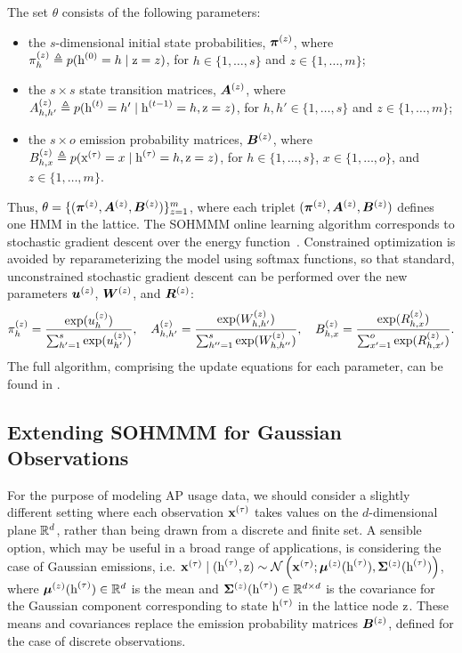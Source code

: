 The set $\theta$ consists of the following parameters:
\begin{itemize}
	\item the $s$-dimensional initial state probabilities, ${\bm{\pi}}^{(z)}$, where ${\pi}_h^{(z)} \triangleq p({\textnormal{h}}^{(0)}=h \mid {\textnormal{z}}=z)$, for $h \in \{1,\dots,s\}$ and $z \in \{1,\dots,m\}$;
	\item the $s \times s$ state transition matrices, ${\bm{A}}^{(z)}$, where ${A}^{(z)}_{h,h'} \triangleq p({\textnormal{h}}^{(t)}=h' \mid {\textnormal{h}}^{(t-1)}=h, {\textnormal{z}}=z)$, for $h,h' \in \{1,\dots,s\}$ and $z \in \{1,\dots,m\}$;
	\item the $s \times o$ emission probability matrices, ${\bm{B}}^{(z)}$, where ${B}^{(z)}_{h,x} \triangleq p({\textnormal{x}}^{(\tau)}=x \mid {\textnormal{h}}^{(\tau)}=h, {\textnormal{z}}=z)$, for $h \in \{1,\dots,s\}$, $x \in \{1,\dots,o\}$, and $z \in \{1,\dots,m\}$.
\end{itemize}
Thus, $\theta = \{({\bm{\pi}}^{(z)}, {\bm{A}}^{(z)}, {\bm{B}}^{(z)})\}_{z=1}^m$, where each triplet $({\bm{\pi}}^{(z)}, {\bm{A}}^{(z)}, {\bm{B}}^{(z)})$ defines one HMM in the lattice. The SOHMMM online learning algorithm corresponds to stochastic gradient descent over the energy function~. Constrained optimization is avoided by reparameterizing the model using softmax functions, so that standard, unconstrained stochastic gradient descent can be performed over the new parameters ${\bm{u}}^{(z)}$, ${\bm{W}}^{(z)}$, and ${\bm{R}}^{(z)}$:
\begin{equation}
{\pi}_h^{(z)} = \frac{\exp({u}_h^{(z)})}{\sum_{h'=1}^{s}\exp({u}_{h'}^{(z)})}, \quad
{A}^{(z)}_{h,h'} = \frac{\exp({W}^{(z)}_{h,h'})}{\sum_{h''=1}^{s} \exp({W}^{(z)}_{h,h''})}, \quad
{B}^{(z)}_{h,x} = \frac{\exp({R}^{(z)}_{h,x})}{\sum_{x'=1}^{o} \exp({R}^{(z)}_{h,x'})}.
\end{equation}
The full algorithm, comprising the update equations for each parameter, can be found in \cite{Ferles2008}.

\subsection{Extending SOHMMM for Gaussian Observations}
\label{sec:sohmmm_gaussian}

For the purpose of modeling AP usage data, we should consider a slightly different setting where each observation ${\mathbf{x}}^{(\tau)}$ takes values on the $d$-dimensional plane ${\mathbb{R}}^d$, rather than being drawn from a discrete and finite set. A sensible option, which may be useful in a broad range of applications, is considering the case of Gaussian emissions, i.e. ${\mathbf{x}}^{(\tau)} \mid ({\textnormal{h}}^{(\tau)}, {\textnormal{z}}) \sim \mathcal{N}\left({\mathbf{x}}^{(\tau)}; {\bm{\mu}}^{(z)}({\textnormal{h}}^{(\tau)}), {\bm{\Sigma}}^{(z)}({\textnormal{h}}^{(\tau)})\right)$, where ${\bm{\mu}}^{(z)}({\textnormal{h}}^{(\tau)}) \in {\mathbb{R}}^d$ is the mean and ${\bm{\Sigma}}^{(z)}({\textnormal{h}}^{(\tau)}) \in {\mathbb{R}}^{d \times d}$ is the covariance for the Gaussian component corresponding to state ${\textnormal{h}}^{(\tau)}$ in the lattice node ${\textnormal{z}}$. These means and covariances replace the emission probability matrices ${\bm{B}}^{(z)}$, defined for the case of discrete observations.

